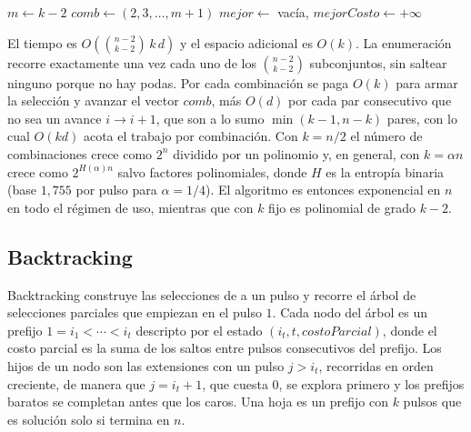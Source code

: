 \begin{algorithm}[htbp]
\caption{Fuerza bruta}
\label{alg:fb}
$m \gets k - 2$\;
$\mathit{comb} \gets (2, 3, \ldots, m+1)$\;
$\mathit{mejor} \gets$ vacía, $\mathit{mejorCosto} \gets +\infty$\;
\end{algorithm}

El tiempo es $O\!\left(\binom{n-2}{k-2}\, k\, d\right)$ y el espacio adicional es $O(k)$. La enumeración recorre exactamente una vez cada uno de los $\binom{n-2}{k-2}$ subconjuntos, sin saltear ninguno porque no hay podas. Por cada combinación se paga $O(k)$ para armar la selección y avanzar el vector $\mathit{comb}$, más $O(d)$ por cada par consecutivo que no sea un avance $i \to i+1$, que son a lo sumo $\min(k-1, n-k)$ pares, con lo cual $O(k d)$ acota el trabajo por combinación. Con $k = n/2$ el número de combinaciones crece como $2^{n}$ dividido por un polinomio y, en general, con $k = \alpha n$ crece como $2^{H(\alpha) n}$ salvo factores polinomiales, donde $H$ es la entropía binaria (base $1{,}755$ por pulso para $\alpha = 1/4$). El algoritmo es entonces exponencial en $n$ en todo el régimen de uso, mientras que con $k$ fijo es polinomial de grado $k-2$.

\subsection{Backtracking}
\label{sec:bt}

Backtracking construye las selecciones de a un pulso y recorre el árbol de selecciones parciales que empiezan en el pulso $1$. Cada nodo del árbol es un prefijo $1 = i_1 < \cdots < i_t$ descripto por el estado $(i_t, t, \mathit{costoParcial})$, donde el costo parcial es la suma de los saltos entre pulsos consecutivos del prefijo. Los hijos de un nodo son las extensiones con un pulso $j > i_t$, recorridas en orden creciente, de manera que $j = i_t + 1$, que cuesta $0$, se explora primero y los prefijos baratos se completan antes que los caros. Una hoja es un prefijo con $k$ pulsos que es solución solo si termina en $n$.

